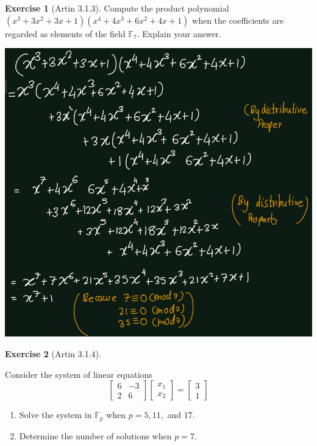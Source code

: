 \documentclass[
]{book}
\providecommand{\tightlist}{%
  \setlength{\itemsep}{0pt}\setlength{\parskip}{0pt}}
\theoremstyle{definition}
\theoremstyle{definition}
\theoremstyle{definition}
\newtheorem{exercise}{Exercise}[chapter]
\theoremstyle{definition}
\theoremstyle{remark}
\begin{document}
\begin{exercise}[Artin 3.1.3]
\protect\hypertarget{exr:unnamed-chunk-250}{}\label{exr:unnamed-chunk-250}Compute the product polynomial \((x^3 + 3x^2 + 3x + 1)(x^4 + 4x^3 + 6x^2 + 4x + 1)\) when the coefficients are regarded as elements of the field \(\mathbb{F}_7\). Explain your answer.
\end{exercise}

\includegraphics{figures/ch_3/ex-1.3.png}

\begin{exercise}[Artin 3.1.4]
\protect\hypertarget{exr:unnamed-chunk-252}{}\label{exr:unnamed-chunk-252}

Consider the system of linear equations
\[\begin{bmatrix}6 & -3\\ 2 & 6\end{bmatrix}
\begin{bmatrix}x_1\\ x_2\end{bmatrix}
=\begin{bmatrix}3\\ 1\end{bmatrix}\]

\begin{enumerate}
\def\labelenumi{\alph{enumi}.}
\tightlist
\item
  Solve the system in \(\mathbb{F}_p\) when \(p = 5, 11,\) and \(17\).
\item
  Determine the number of solutions when \(p = 7\).
\end{enumerate}

\end{exercise}
\end{document}
